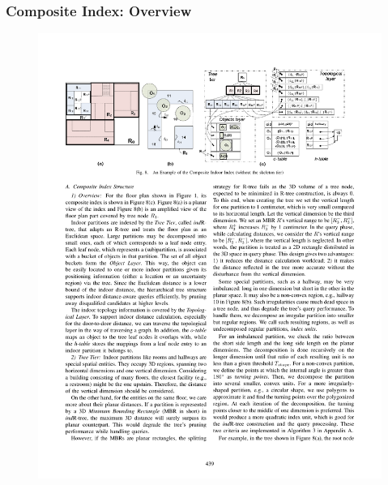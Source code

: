 
\begin{frame}
\frametitle{Composite Index: Overview}

\begin{figure}[tb]
  \includegraphics[width=\columnwidth]{figures/2-6/2-6-9.pdf}
\end{figure}

\end{frame}


